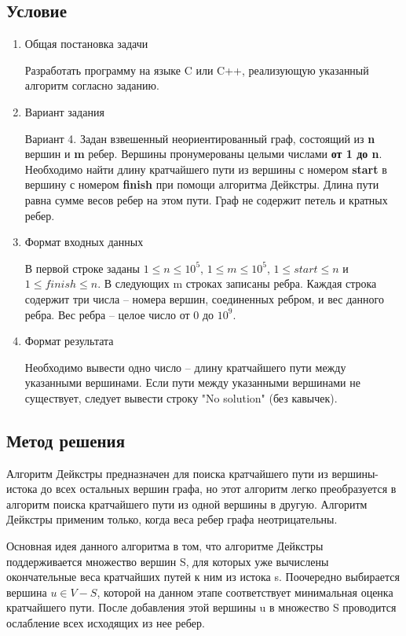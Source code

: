 \documentclass[12pt]{article}
\begin{document}
\subsection*{Условие}
\begin{enumerate}
\item Общая постановка задачи 

Разработать программу на языке C или C++, реализующую указанный алгоритм согласно заданию.

\item Вариант задания 

Вариант 4. Задан взвешенный неориентированный граф, состоящий из \textbf{n} вершин и \textbf{m} ребер. Вершины пронумерованы целыми числами \textbf{от 1 до n}. Необходимо найти длину кратчайшего пути из вершины с номером \textbf{start} в вершину с номером \textbf{finish} при помощи алгоритма Дейкстры. Длина пути равна сумме весов ребер на этом пути. Граф не содержит петель и кратных ребер.

\item Формат входных данных

В первой строке заданы $1 \leq n \leq 10^5$, $1 \leq m \leq 10^5$, $1 \leq start \leq n$ и $1 \leq finish \leq n$. В следующих m строках записаны ребра. Каждая строка содержит три числа – номера вершин, соединенных ребром, и вес данного ребра. Вес ребра – целое число от 0 до $10^9$.

\item Формат результата

Необходимо вывести одно число – длину кратчайшего пути между указанными вершинами. Если пути между указанными вершинами не существует, следует вывести строку "No solution" (без кавычек).

\end{enumerate}

\subsection*{Метод решения}

Алгоритм Дейкстры предназначен для поиска кратчайшего пути из вершины-истока до всех остальных вершин графа, но этот алгоритм легко преобразуется в алгоритм поиска кратчайшего пути из одной вершины в другую. Алгоритм Дейкстры применим только, когда веса ребер графа неотрицательны.

Основная идея данного алгоритма в том, что алгоритме Дейкстры поддерживается множество вершин S, для которых уже вычислены окончательные веса кратчайших путей к ним из истока s. Поочередно выбирается вершина $u \in V - S$, которой на данном этапе соответствует минимальная оценка кратчайшего пути. После добавления этой вершины u в множество S проводится ослабление всех исходящих из нее ребер.
\end{document}
